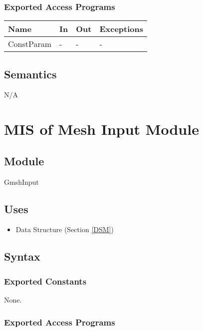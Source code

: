 \documentclass[12pt, titlepage]{article}
\begin{document}
\subsubsection{Exported Access Programs}

\begin{center}
	\begin{tabular}{p{2cm} p{4cm} p{4cm} p{2cm}}
		\hline
		\textbf{Name} & \textbf{In} & \textbf{Out} & \textbf{Exceptions} \\
		\hline
		ConstParam & - & - & - \\
		\hline
	\end{tabular}
\end{center}

\subsection{Semantics}
N/A

\newpage
%
%
%
%

\section{MIS of Mesh Input Module} \label{MIM} 
 
\subsection{Module}
GmshInput

\subsection{Uses}
\begin{itemize}
	\item Data Structure (Section \ref{DSM})
	
\end{itemize}

\subsection{Syntax}

\subsubsection{Exported Constants}
None.
\subsubsection{Exported Access Programs}
\end{document}
